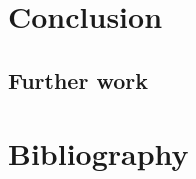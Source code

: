 \documentclass[12pt,a4paper,twoside]{scrartcl}
\numberwithin{equation}{section}
\begin{document}
\clearpage
\section{Conclusion}
\label{sec:conc}
\subsection{Further work}
\clearpage
\section{Bibliography}


\end{document}
